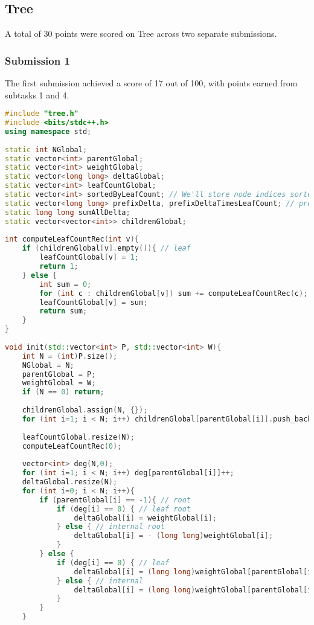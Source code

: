 \subsection{Tree}
A total of 30 points were scored on Tree across two separate submissions.

\subsubsection{Submission 1}
The first submission achieved a score of 17 out of 100, with points earned from subtasks 1 and 4.

\begin{lstlisting}[language=C++]
#include "tree.h"
#include <bits/stdc++.h>
using namespace std;
 
static int NGlobal;
static vector<int> parentGlobal;
static vector<int> weightGlobal;
static vector<long long> deltaGlobal;
static vector<int> leafCountGlobal;
static vector<int> sortedByLeafCount; // We'll store node indices sorted by leaf count.
static vector<long long> prefixDelta, prefixDeltaTimesLeafCount; // prefix sums in sorted order by leaf count.
static long long sumAllDelta;
static vector<vector<int>> childrenGlobal;
 
int computeLeafCountRec(int v){
    if (childrenGlobal[v].empty()){ // leaf
        leafCountGlobal[v] = 1;
        return 1;
    } else {
        int sum = 0;
        for (int c : childrenGlobal[v]) sum += computeLeafCountRec(c);
        leafCountGlobal[v] = sum;
        return sum;
    }
}
 
void init(std::vector<int> P, std::vector<int> W){
    int N = (int)P.size();
    NGlobal = N;
    parentGlobal = P;
    weightGlobal = W;
    if (N == 0) return;
 
    childrenGlobal.assign(N, {});
    for (int i=1; i < N; i++) childrenGlobal[parentGlobal[i]].push_back(i);
 
    leafCountGlobal.resize(N);
    computeLeafCountRec(0);
 
    vector<int> deg(N,0);
    for (int i=1; i < N; i++) deg[parentGlobal[i]]++;
    deltaGlobal.resize(N);
    for (int i=0; i < N; i++){
        if (parentGlobal[i] == -1){ // root
            if (deg[i] == 0) { // leaf root
                deltaGlobal[i] = weightGlobal[i];
            } else { // internal root
                deltaGlobal[i] = - (long long)weightGlobal[i];
            }
        } else {
            if (deg[i] == 0) { // leaf
                deltaGlobal[i] = (long long)weightGlobal[parentGlobal[i]] + (long long)weightGlobal[i];
            } else { // internal
                deltaGlobal[i] = (long long)weightGlobal[parentGlobal[i]] - (long long)weightGlobal[i];
            }
        }
    }
 

\end{lstlisting}
